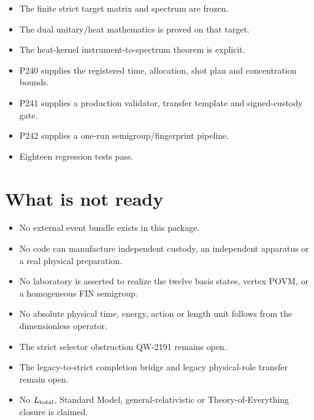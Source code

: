 \documentclass[11pt,a4paper,openany]{report}
\begin{document}
\begin{itemize}
\item 
The finite strict target matrix and spectrum are frozen.

\item 
The dual unitary/\allowbreak{}heat mathematics is proved on that target.

\item 
The heat-kernel instrument-to-spectrum theorem is explicit.

\item 
P240 supplies the registered time, allocation, shot plan and concentration bounds.

\item 
P241 supplies a production validator, transfer template and signed-custody gate.

\item 
P242 supplies a one-run semigroup/\allowbreak{}fingerprint pipeline.

\item 
Eighteen regression tests pass.

\end{itemize}

\section{What is not ready}

\begin{itemize}
\item 
No external event bundle exists in this package.

\item 
No code can manufacture independent custody, an independent apparatus or a real physical preparation.

\item 
No laboratory is asserted to realize the twelve basis states, vertex POVM, or a homogeneous FIN semigroup.

\item 
No absolute physical time, energy, action or length unit follows from the dimensionless operator.

\item 
The strict selector obstruction QW-2191 remains open.

\item 
The legacy-to-strict completion bridge and legacy physical-role transfer remain open.

\item 
No \(L_{\rm total}\), Standard Model, general-relativistic or Theory-of-Everything closure is claimed.

\end{itemize}
\end{document}
